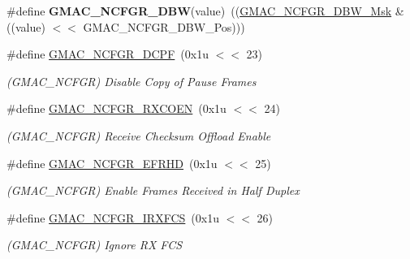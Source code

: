 \begin{DoxyCompactItemize}
\#define {\bfseries G\+M\+A\+C\+\_\+\+N\+C\+F\+G\+R\+\_\+\+D\+BW}(value)~((\mbox{\hyperlink{group__SAMV71__GMAC_ga22a3e61570b9c91999eee595eb80e7ea}{G\+M\+A\+C\+\_\+\+N\+C\+F\+G\+R\+\_\+\+D\+B\+W\+\_\+\+Msk}} \& ((value) $<$$<$ G\+M\+A\+C\+\_\+\+N\+C\+F\+G\+R\+\_\+\+D\+B\+W\+\_\+\+Pos)))
\item 
\mbox{\label{group__SAMV71__GMAC_gaea8a144405e81e588aa521ff38de9513}} 
\#define \mbox{\hyperlink{group__SAMV71__GMAC_gaea8a144405e81e588aa521ff38de9513}{G\+M\+A\+C\+\_\+\+N\+C\+F\+G\+R\+\_\+\+D\+C\+PF}}~(0x1u $<$$<$ 23)
\begin{DoxyCompactList}\small\item\em (G\+M\+A\+C\+\_\+\+N\+C\+F\+GR) Disable Copy of Pause Frames \end{DoxyCompactList}\item 
\mbox{\label{group__SAMV71__GMAC_gafb7b23d348e90c9649fd2407c0e8dc18}} 
\#define \mbox{\hyperlink{group__SAMV71__GMAC_gafb7b23d348e90c9649fd2407c0e8dc18}{G\+M\+A\+C\+\_\+\+N\+C\+F\+G\+R\+\_\+\+R\+X\+C\+O\+EN}}~(0x1u $<$$<$ 24)
\begin{DoxyCompactList}\small\item\em (G\+M\+A\+C\+\_\+\+N\+C\+F\+GR) Receive Checksum Offload Enable \end{DoxyCompactList}\item 
\mbox{\label{group__SAMV71__GMAC_ga687081e221ae5a20121485fdb775c689}} 
\#define \mbox{\hyperlink{group__SAMV71__GMAC_ga687081e221ae5a20121485fdb775c689}{G\+M\+A\+C\+\_\+\+N\+C\+F\+G\+R\+\_\+\+E\+F\+R\+HD}}~(0x1u $<$$<$ 25)
\begin{DoxyCompactList}\small\item\em (G\+M\+A\+C\+\_\+\+N\+C\+F\+GR) Enable Frames Received in Half Duplex \end{DoxyCompactList}\item 
\mbox{\label{group__SAMV71__GMAC_gac94d24190c16ca0634fc80cf82f32d7a}} 
\#define \mbox{\hyperlink{group__SAMV71__GMAC_gac94d24190c16ca0634fc80cf82f32d7a}{G\+M\+A\+C\+\_\+\+N\+C\+F\+G\+R\+\_\+\+I\+R\+X\+F\+CS}}~(0x1u $<$$<$ 26)
\begin{DoxyCompactList}\small\item\em (G\+M\+A\+C\+\_\+\+N\+C\+F\+GR) Ignore RX F\+CS \end{DoxyCompactList}\item 
$$
\end{DoxyCompactItemize}
